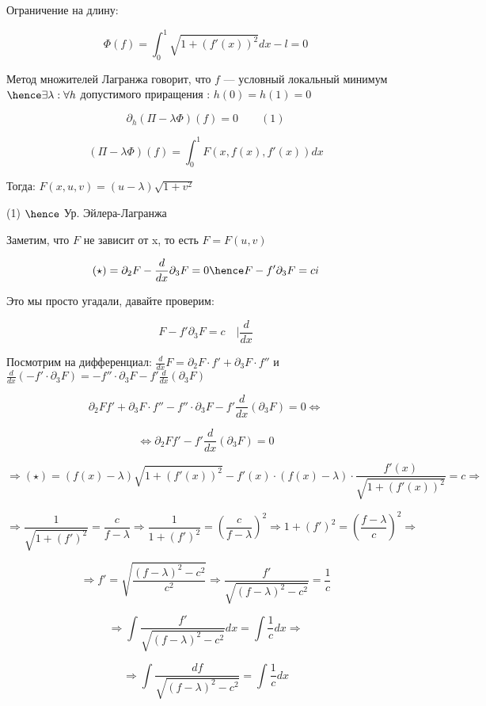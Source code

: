 Ограничение на длину:

\[
    \Phi(f) = \int_0^1 \sqrt{1 + (f'(x))^2} dx - l = 0
\]


Метод множителей Лагранжа говорит, что
$f$ --- условный локальный минимум 
$\hence \exists \lambda : \forall h$ 
допустимого приращения : $h(0) = h(1) = 0$ 

\[
    \partial_h (\Pi - \lambda \Phi)(f) = 0  \quad \quad (1)
\]

\[
    (\Pi - \lambda \Phi)(f) = \int_0^1 F(x, f(x), f'(x)) dx
\]

Тогда: $F(x, u, v) = (u - \lambda) \sqrt{1 + v ^ 2}$

(1) $\hence$ Ур. Эйлера-Лагранжа

Заметим, что $F$ не зависит от x, то есть $F = F(u, v)$

\[
    (\star) = \partial_2 F - \frac{d}{dx} \partial_3 F = 0 \hence F - f' \partial_3 F = ci
\]

Это мы просто угадали, давайте проверим:

\[
    F - f' \partial_3 F = c \quad \bigg | \frac{d}{dx}
\]

Посмотрим на дифференциал: $\frac d {dx} F = \partial_2 F \cdot f' + \partial_3 F \cdot f''$ и $\frac d {dx} (- f' \cdot \partial_3 F) = -f'' \cdot \partial_3 F - f' \frac d {dx} (\partial_3 F)$

\[
    \partial_2 F f' + \partial_3 F \cdot f'' - f'' \cdot \partial_3 F - f' \frac{d}{dx}(\partial_3 F) = 0 \Leftrightarrow
\]


\[
    \Leftrightarrow \partial_2 F f' - f' \frac{d}{dx}(\partial_3 F) = 0
\]

\[
    \Rightarrow (\star) = (f(x) - \lambda) \sqrt{1 + (f'(x)) ^ 2} - f'(x) \cdot (f(x) - \lambda) \cdot \frac{f'(x)}{\sqrt{1 + (f'(x)) ^ 2}} = c \Rightarrow
\]

\[
    \Rightarrow \frac{1}{\sqrt{1 + (f')^2}} = \frac{c}{f - \lambda} \Rightarrow \frac{1}{1 + (f')^2} = (\frac{c}{f - \lambda}) ^ 2 \Rightarrow 1 + (f') ^ 2 = \left(\frac{f - \lambda}{c}\right) ^ 2 \Rightarrow
\]

\[
    \Rightarrow f' = \sqrt{\frac{(f -  \lambda)  ^ 2 - c ^ 2}{c ^ 2}} \Rightarrow \frac{f'}{\sqrt{(f - \lambda) ^ 2 - c ^ 2}} = \frac{1}{c}
\]

\[
    \Rightarrow \int \frac{f'}{\sqrt{(f - \lambda) ^ 2 - c ^ 2}} dx = \int \frac{1}{c} dx \Rightarrow
\]

\[
    \Rightarrow \int \frac {df} {\sqrt{(f - \lambda)^2 - c^2}} = \int \frac 1 c dx
\]

